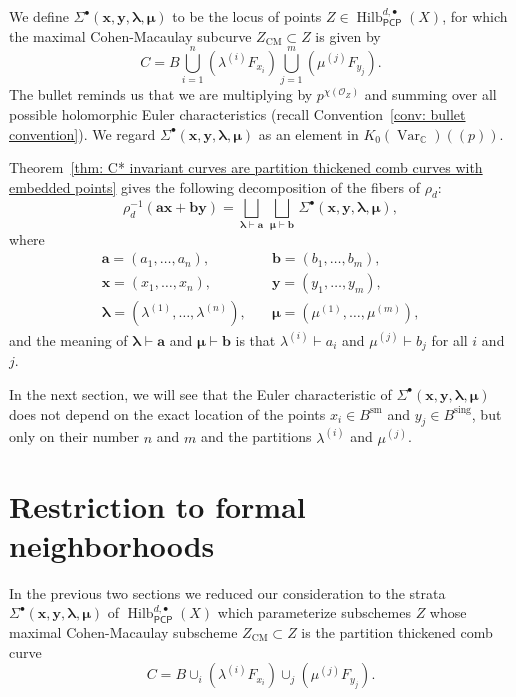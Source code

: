 \documentclass[12pt]{amsart}
\theoremstyle{definition}
\newcommand{\CC} {\mathbb{C}}          %
\renewcommand{\O}{\mathcal{O}}
\newcommand{\Hilb}{\operatorname{Hilb}}
\newcommand{\CM}{\operatorname{CM}}
\newcommand{\Var}{\operatorname{Var}}
\newcommand{\sm}{\operatorname{sm}}
\newcommand{\sing}{\operatorname{sing}}
\newcommand{\boldx}{\boldsymbol{x}}
\newcommand{\boldy}{\boldsymbol{y}}
\newcommand{\bolda}{\boldsymbol{a}}
\newcommand{\boldb}{\boldsymbol{b}}
\newcommand{\boldlambda}{\boldsymbol{\lambda }}
\newcommand{\boldmu}{\boldsymbol{\mu }}
\newcommand{\Sigmaxylambdamu}{\Sigma^{\bullet }(\boldx ,\boldy ,\boldlambda ,\boldmu )}
\newcommand{\PCP}{\mathsf{PCP}}
\begin{document}
We define $\Sigmaxylambdamu $ to be the
locus of points $Z \in \Hilb^{d,\bullet}_{\PCP }(X)$, for which the
maximal Cohen-Macaulay subcurve $Z_{\CM} \subset Z$ is given by
\[
C = B \bigcup_{i=1}^{n}\left(\lambda^{(i)}F_{x_{i}} \right)
\bigcup_{j=1}^{m}\left(\mu^{(j)}F_{y_{j}} \right).
\]
The bullet reminds us that we are multiplying by $p^{\chi (\O_{Z})}$
and summing over all possible holomorphic Euler characteristics
(recall Convention~\ref{conv: bullet convention}). We regard
$\Sigmaxylambdamu$ as an element in $ K_{0}(\Var_{\CC})(\!(p)\!)$.

Theorem~\ref{thm: C* invariant curves are
partition thickened comb curves with embedded points} gives the
following decomposition of the fibers of $\rho_{d}$:
\begin{equation} \label{eqn: components of fibers of rho}
\rho_{d}^{-1}(\bolda \boldx +\boldb \boldy ) = \bigsqcup_{\boldlambda
\vdash \bolda}\, \bigsqcup_{\boldmu \vdash \boldb}\,  \Sigmaxylambdamu,
\end{equation}
where 
\begin{align*}
\bolda =(a_{1},\dotsc ,a_{n}),&\quad \boldb =(b_{1},\dotsc
,b_{m}),\\
\boldx =(x_{1},\dotsc ,x_{n}),&\quad \boldy =(y_{1},\dotsc
,y_{m}),\\
\boldlambda =(\lambda^{(1)},\dotsc ,\lambda^{(n)}),&\quad \boldmu =(\mu^{(1)},\dotsc ,\mu^{(m)}),
\end{align*}
and the meaning of $\boldlambda \vdash \bolda$ and $\boldmu \vdash
\boldb$ is that $\lambda^{(i)}\vdash a_{i}$ and $\mu^{(j)}\vdash
b_{j}$ for all $i$ and $j$. 



In the next section, we will see that the Euler characteristic of
$\Sigmaxylambdamu $ does not depend on the exact location of
the points $x_i \in B^{\sm}$ and $y_j \in B^{\sing}$, but only on
their number $n$ and $m$ and the partitions $\lambda^{(i)}$ and
$\mu^{(j)}$.



\section{Restriction to formal neighborhoods} \label{sec: restriction
to formal nghds}

In the previous two sections we reduced our consideration to the
strata $\Sigmaxylambdamu $
of $ \Hilb^{d,\bullet}_{\PCP }(X)$ which parameterize subschemes $Z$ whose maximal
Cohen-Macaulay subscheme $Z_{\CM} \subset Z$ is the partition
thickened comb curve 
\[
C=B\cup_{i}(\lambda^{(i)}F_{x_{i}})\cup_{j}(\mu^{(j)}F_{y_{j}}).
\]
\end{document}
